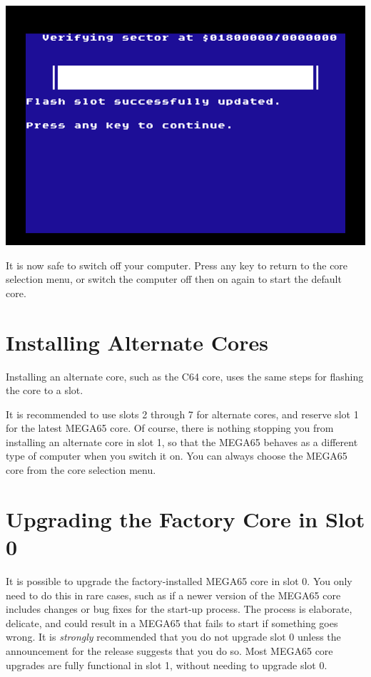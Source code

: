 \begin{center}
  \includegraphics[width=0.7\linewidth]{images/ss-flashmenu-done.png}
\end{center}

It is now safe to switch off your computer. Press any key to return to the core selection menu, or switch the computer off then on again to start the default core.


\newpage
\section{Installing Alternate Cores}

Installing an alternate core, such as the C64 core, uses the same steps for flashing the core to a slot.

It is recommended to use slots 2 through 7 for alternate cores, and reserve slot 1 for the latest MEGA65 core. Of course, there is nothing stopping you from installing an alternate core in slot 1, so that the MEGA65 behaves as a different type of computer when you switch it on. You can always choose the MEGA65 core from the core selection menu.


\newpage

\section{Upgrading the Factory Core in Slot 0}

It is possible to upgrade the factory-installed MEGA65 core in slot 0. You only need to do this in rare cases, such as if a newer version of the MEGA65 core includes changes or bug fixes for the start-up process. The process is elaborate, delicate, and could result in a MEGA65 that fails to start if something goes wrong. It is {\em strongly} recommended that you do not upgrade slot 0 unless the announcement for the release suggests that you do so. Most MEGA65 core upgrades are fully functional in slot 1, without needing to upgrade slot 0.

